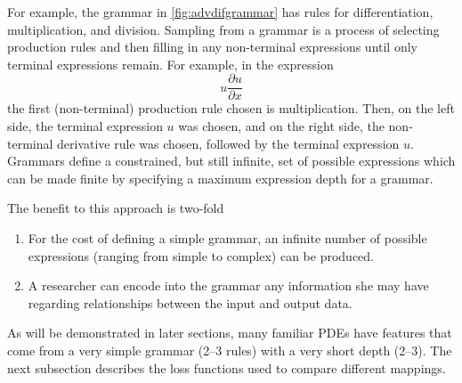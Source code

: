 \documentclass{article}
\begin{document}
For example, the grammar in \cref{fig:advdifgrammar} has rules for differentiation, multiplication, and division. Sampling from a grammar is a process of selecting production rules and then filling in any non-terminal expressions until only terminal expressions remain. For example, in the expression 
\begin{equation}
    u \frac{\partial u}{\partial x }
\end{equation}
the first (non-terminal) production rule chosen is multiplication. Then, on the left side, the terminal expression $u$ was chosen, and on the right side, the non-terminal derivative rule was chosen, followed by the terminal expression $u$. Grammars define a constrained, but still infinite, set of possible expressions which can be made finite by specifying a maximum expression depth for a grammar. 

The benefit to this approach is two-fold
\begin{enumerate}
    \item For the cost of defining a simple grammar, an infinite number of possible expressions (ranging from simple to complex) can be produced.
    \item A researcher can encode into the grammar any information she may have regarding relationships between the input and output data.
\end{enumerate}
As will be demonstrated in later sections, many familiar PDEs have features that come from a very simple grammar (2--3 rules) with a very short depth (2--3). The next subsection describes the loss functions used to compare different mappings.  
\end{document}
